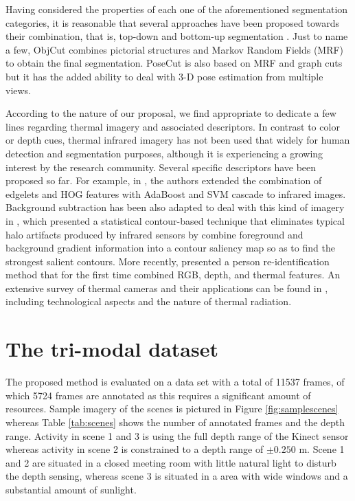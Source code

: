 \documentclass[10pt,twocolumn,letterpaper]{article}
\begin{document}
Having considered the properties of each one of the aforementioned segmentation categories, it is reasonable that several approaches have been proposed towards their combination, that is, top-down and bottom-up segmentation \cite{lin2007interactive, mori2004recovering, ladicky2010and, levin2006learning}. Just to name a few, ObjCut \cite{kumar2005obj} combines pictorial structures and Markov Random Fields (MRF) to obtain the final segmentation. PoseCut \cite{bray2006posecut} is also based on MRF and graph cuts but it has the added ability to deal with 3-D pose estimation from multiple views.
 
According to the nature of our proposal, we find appropriate to dedicate a few lines regarding thermal imagery and associated descriptors. In contrast to color or depth cues, thermal infrared imagery has not been used that widely for human detection and segmentation purposes, although it is experiencing a growing interest by the research community. Several specific descriptors have been proposed so far. For example, in \cite{zhang2007pedestrian}, the authors extended the combination of edgelets and HOG features with AdaBoost and SVM cascade to infrared images. Background subtraction has been also adapted to deal with this kind of imagery in \cite{davis2004robust}, which presented a statistical contour-based technique that eliminates typical halo artifacts produced by infrared sensors by combine foreground and background gradient information into a contour saliency map so as to find the strongest salient contours. More recently, \cite{mogelmosetri} presented a person re-identification method that for the first time combined RGB, depth, and thermal features. An extensive survey of thermal cameras and their applications can be found in \cite{gade2014thermal}, including technological aspects and the nature of thermal radiation. 
 
\section{The tri-modal dataset}
\label{sec:dataset}

The proposed method is evaluated on a data set with a total of 11537 frames, of which 5724 frames are annotated as this requires a significant amount of resources. Sample imagery of the scenes is pictured in Figure \ref{fig:samplescenes} whereas Table \ref{tab:scenes} shows the number of annotated frames and the depth range. Activity in scene 1 and 3 is using the full depth range of the Kinect sensor whereas activity in scene 2 is constrained to a depth range of $\pm 0.250$ m. Scene 1 and 2 are situated in a closed meeting room with little natural light to disturb the depth sensing, whereas scene 3 is situated in a area with wide windows and a substantial amount of sunlight.
\end{document}
